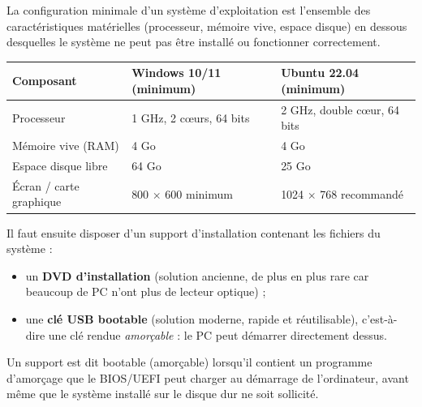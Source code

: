\documentclass[11pt]{article}
\newcommand{\cle}[1]{{\popxbold\color{popdark}#1}}
\begin{document}
\begin{definition}
La \cle{configuration minimale} d'un système d'exploitation est l'ensemble des caractéristiques matérielles (processeur, mémoire vive, espace disque) en dessous desquelles le système ne peut pas être installé ou fonctionner correctement.
\end{definition}

\begin{center}
\begin{tabularx}{\linewidth}{|l|X|X|}
\hline
\rowcolor{popblueL} \textbf{Composant} & \textbf{Windows 10/11 (minimum)} & \textbf{Ubuntu 22.04 (minimum)} \\
\hline
Processeur & 1 GHz, 2 cœurs, 64 bits & 2 GHz, double cœur, 64 bits \\
\hline
Mémoire vive (RAM) & 4 Go & 4 Go \\
\hline
Espace disque libre & 64 Go & 25 Go \\
\hline
Écran / carte graphique & 800 $\times$ 600 minimum & 1024 $\times$ 768 recommandé \\
\hline
\end{tabularx}
\end{center}

Il faut ensuite disposer d'un \cle{support d'installation} contenant les fichiers du système :

\begin{itemize}
\item un \textbf{DVD d'installation} (solution ancienne, de plus en plus rare car beaucoup de PC n'ont plus de lecteur optique) ;
\item une \textbf{clé USB bootable} (solution moderne, rapide et réutilisable), c'est-à-dire une clé rendue \emph{amorçable} : le PC peut démarrer directement dessus.
\end{itemize}

\begin{definition}
Un support est dit \cle{bootable} (amorçable) lorsqu'il contient un programme d'amorçage que le BIOS/UEFI peut charger au démarrage de l'ordinateur, avant même que le système installé sur le disque dur ne soit sollicité.
\end{definition}
\end{document}
